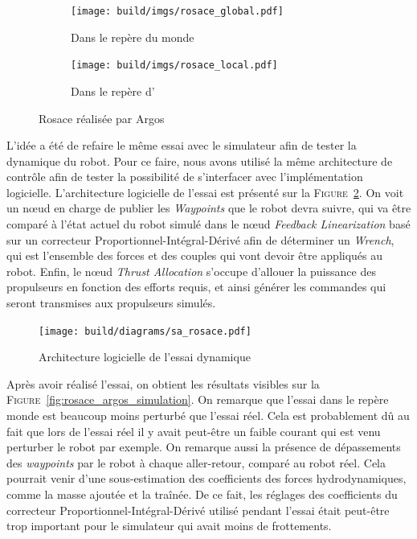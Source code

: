 			\begin{figure}[!htb]
				\centering
				\begin{subfigure}[t]{0.48\textwidth}
					\centering
					\texttt{[image: build/imgs/rosace\_global.pdf]}
					\caption{Dans le repère du monde}
				\end{subfigure}
				\hfill
				\begin{subfigure}[t]{0.48\textwidth}
					\centering
					\texttt{[image: build/imgs/rosace\_local.pdf]}
					\caption{Dans le repère d'\argos{}}
				\end{subfigure}
				\caption{Rosace réalisée par Argos}
				\label{fig:rosace_argos}
			\end{figure}

			L'idée a été de refaire le même essai avec le simulateur afin de tester la dynamique du robot. Pour ce faire, nous avons utilisé la même architecture de contrôle afin de tester la possibilité de s'interfacer avec l'implémentation logicielle. L'architecture logicielle de l'essai est présenté sur la \textsc{Figure}~\ref{fig:sa_rosace}. On voit un n\oe ud en charge de publier les \textit{Waypoints} que le robot devra suivre, qui va être comparé à l'état actuel du robot simulé dans le n\oe ud \textit{Feedback Linearization} basé sur un correcteur Proportionnel-Intégral-Dérivé afin de déterminer un \textit{Wrench}, qui est l'ensemble des forces et des couples qui vont devoir être appliqués au robot. Enfin, le n\oe ud \textit{Thrust Allocation} s'occupe d'allouer la puissance des propulseurs en fonction des efforts requis, et ainsi générer les commandes qui seront transmises aux propulseurs simulés.

			\begin{figure}[!htb]
				\centering
				\texttt{[image: build/diagrams/sa\_rosace.pdf]}
				\caption{Architecture logicielle de l'essai dynamique}
				\label{fig:sa_rosace}
			\end{figure}

			Après avoir réalisé l'essai, on obtient les résultats visibles sur la \textsc{Figure}~\ref{fig:rosace_argos_simulation}. On remarque que l'essai dans le repère monde est beaucoup moins perturbé que l'essai réel. Cela est probablement dû au fait que lors de l'essai réel il y avait peut-être un faible courant qui est venu perturber le robot par exemple. On remarque aussi la présence de dépassements des \textit{waypoints} par le robot à chaque aller-retour, comparé au robot réel. Cela pourrait venir d'une sous-estimation des coefficients des forces hydrodynamiques, comme la masse ajoutée et la traînée. De ce fait, les réglages des coefficients du correcteur Proportionnel-Intégral-Dérivé utilisé pendant l'essai était peut-être trop important pour le simulateur qui avait moins de frottements.

